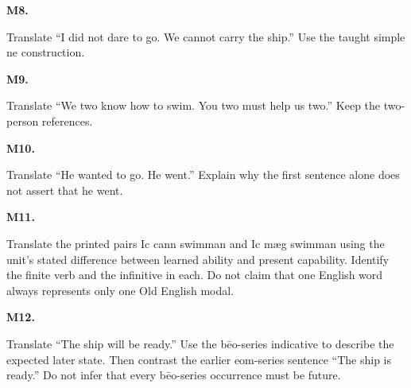 \par\begin{minipage}{\linewidth}\raggedright
\textbf{M8.}

Translate “I did not dare to go. We cannot carry the ship.” Use the taught simple ne construction.

\end{minipage}\par\addvspace{4pt}

\par\begin{minipage}{\linewidth}\raggedright
\textbf{M9.}

Translate “We two know how to swim. You two must help us two.” Keep the two-person references.

\end{minipage}\par\addvspace{4pt}

\par\begin{minipage}{\linewidth}\raggedright
\textbf{M10.}

Translate “He wanted to go. He went.” Explain why the first sentence alone does not assert that he went.

\end{minipage}\par\addvspace{4pt}

\par\begin{minipage}{\linewidth}\raggedright
\textbf{M11.}

Translate the printed pairs Ic cann swimman and Ic mæg swimman using the unit’s stated difference between learned ability and present capability. Identify the finite verb and the infinitive in each. Do not claim that one English word always represents only one Old English modal.

\end{minipage}\par\addvspace{4pt}

\par\begin{minipage}{\linewidth}\raggedright
\textbf{M12.}

Translate “The ship will be ready.” Use the bēo-series indicative to describe the expected later state. Then contrast the earlier eom-series sentence “The ship is ready.” Do not infer that every bēo-series occurrence must be future.

\end{minipage}\par\addvspace{4pt}

